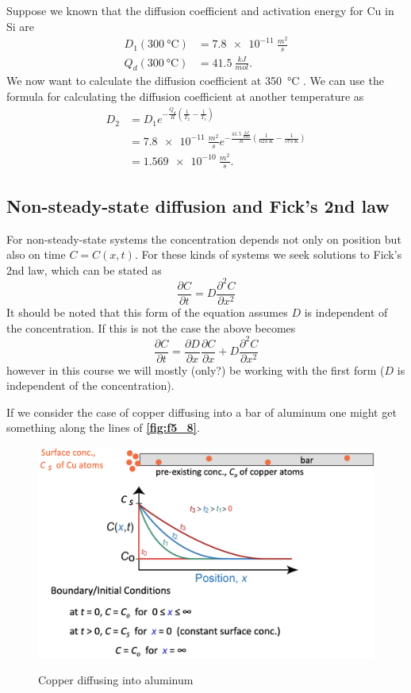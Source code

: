 \begin{exa}
  Suppose we known that the diffusion coefficient and activation energy for Cu in Si are
  \begin{align*}
    D_1(\qty{300}{\celsius}) &= \qty{7,8e-11}{\frac{m^2}{s}} \\
    Q_d(\qty{300}{\celsius}) &= \qty{41,5}{\frac{kJ}{mol}} 
  .\end{align*}
  We now want to calculate the diffusion coefficient at \qty{350}{\celsius} .
  \bigbreak
  We can use the formula for calculating the diffusion coefficient at another temperature as
  \begin{align*}
    D_2 &= D_1 e^{- \frac{Q_d}{R} \left( \frac{1}{T_2} - \frac{1}{T_1} \right)} \\
    &= \qty{7,8e-11}{\frac{m^2}{s}} e^{- \frac{\qty{41,5}{\frac{kJ}{mol}}}{R} \left( \frac{1}{\qty{623}{K}} - \frac{1}{\qty{573}{\kelvin}} \right)} \\
    &= \qty{1,569e-10}{\frac{m^2}{s}} 
  .\end{align*}
\end{exa}

\subsection{Non-steady-state diffusion and Fick's 2nd law}
For non-steady-state systems the concentration depends not only on position but also on time $C = C(x,t)$. For these kinds of systems we seek solutions to Fick's 2nd law, which can be stated as
\begin{equation} \label{eq:fick2}
  \frac{\partial C}{\partial t} = D \frac{\partial^2 C}{\partial x^2}
\end{equation}
It should be noted that this form of the equation assumes $D$ is independent of the concentration. If this is not the case the above becomes
\[ 
\frac{\partial C}{\partial t} = \frac{\partial D}{\partial x} \frac{\partial C}{\partial x} + D \frac{\partial^2 C}{\partial x^2}
\]
however in this course we will mostly (only?) be working with the first form ($D$ is independent of the concentration).

If we consider the case of copper diffusing into a bar of aluminum one might get something along the lines of \textbf{\autoref{fig:f5_8}}.
\begin{figure} [ht]
  \centering
  \caption{Copper diffusing into aluminum}
  \includegraphics[width=0.75\linewidth]{./figures/f5_8.png}
  \label{fig:f5_8}
\end{figure}

